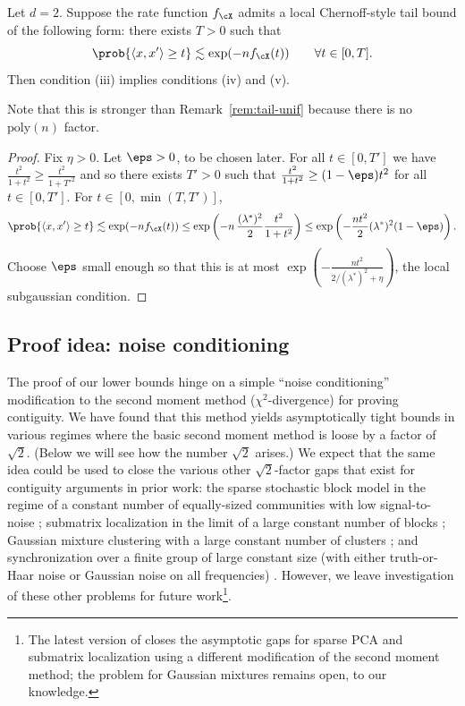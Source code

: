 \documentclass{article}
\begin{document}
\begin{proposition}
\label{prop:chernoff-subg}
Let $d = 2$. Suppose the rate function $f_\cX$ admits a local Chernoff-style tail bound of the following form: there exists $T > 0$ such that
$$\prob{\langle x,x' \rangle \ge t} \lesssim \exp(-nf_\cX(t)) \qquad \forall t \in [0,T].$$
Then condition (iii) implies conditions (iv) and (v).
\end{proposition}
\noindent Note that this is stronger than Remark~\ref{rem:tail-unif} because there is no $\mathrm{poly}(n)$ factor.
\begin{proof}
Fix $\eta > 0$. Let $\eps > 0$, to be chosen later. For all $t \in [0,T']$ we have $\frac{t^2}{1+t^2} \ge \frac{t^2}{1+T'^2}$ and so there exists $T' > 0$ such that $\frac{t^2}{1+t^2} \ge (1-\eps)t^2$ for all $t \in [0,T']$. For $t \in [0,\min(T,T')]$,
$$\prob{\langle x,x' \rangle \ge t} \lesssim \exp(-n f_\cX(t)) \le \exp\left(-n\, \frac{(\lambda^*)^2}{2} \frac{t^2}{1+t^2}\right) \le \exp\left(-\frac{nt^2}{2} (\lambda^*)^2(1-\eps)\right).$$
Choose $\eps$ small enough so that this is at most $\exp\left(-\frac{nt^2}{2/(\lambda^*)^2 + \eta}\right)$, the local subgaussian condition.
\end{proof}






\subsection{Proof idea: noise conditioning}
\label{sec:noise-cond}

The proof of our lower bounds hinge on a simple ``noise conditioning'' modification to the second moment method ($\chi^2$-divergence) for proving contiguity. We have found that this method yields asymptotically tight bounds in various regimes where the basic second moment method is loose by a factor of $\sqrt{2}$. (Below we will see how the number $\sqrt{2}$ arises.) We expect that the same idea could be used to close the various other $\sqrt{2}$-factor gaps that exist for contiguity arguments in prior work: the sparse stochastic block model in the regime of a constant number of equally-sized communities with low signal-to-noise \cite{bmnn}; submatrix localization in the limit of a large constant number of blocks \cite{bmvx}; Gaussian mixture clustering with a large constant number of clusters \cite{bmvx}; and synchronization over a finite group of large constant size (with either truth-or-Haar noise or Gaussian noise on all frequencies) \cite{pwbm}. However, we leave investigation of these other problems for future work\footnote{The latest version of \cite{bmvvx} closes the asymptotic gaps  for sparse PCA and submatrix localization using a different modification of the second moment method; the problem for Gaussian mixtures remains open, to our knowledge.}.
\end{document}
